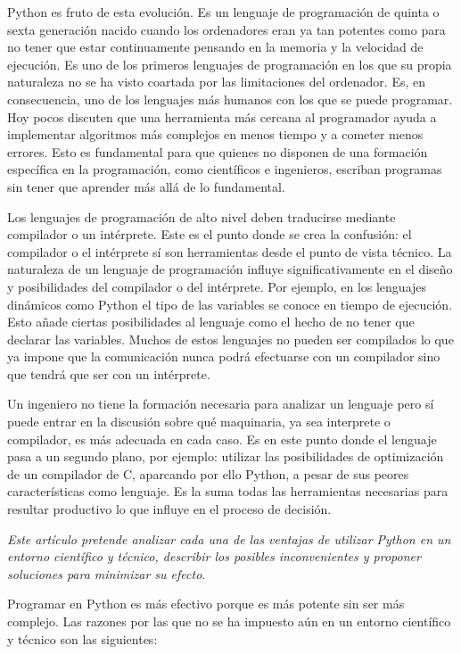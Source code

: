 \documentclass[a4paper,10pt]{article}
\begin{document}
Python es fruto de esta evolución.  Es un lenguaje de programación de
quinta o sexta generación nacido cuando los ordenadores eran ya tan
potentes como para no tener que estar continuamente pensando en la
memoria y la velocidad de ejecución.  Es uno de los primeros lenguajes
de programación en los que su propia naturaleza no se ha visto
coartada por las limitaciones del ordenador. Es, en consecuencia, uno
de los lenguajes más humanos con los que se puede programar. Hoy pocos
discuten que una herramienta más cercana al programador ayuda a
implementar algoritmos más complejos en menos tiempo y a cometer menos
errores. Esto es fundamental para que quienes no disponen de una
formación específica en la programación, como científicos e
ingenieros, escriban programas sin tener que aprender más allá de lo
fundamental.

Los lenguajes de programación de alto nivel deben traducirse mediante
compilador o un intérprete. Este es el punto donde se crea la
confusión: el compilador o el intérprete sí son herramientas desde el
punto de vista técnico. La naturaleza de un lenguaje de programación
influye significativamente en el diseño y posibilidades del compilador
o del intérprete.  Por ejemplo, en los lenguajes dinámicos como Python
el tipo de las variables se conoce en tiempo de ejecución.  Esto añade
ciertas posibilidades al lenguaje como el hecho de no tener que
declarar las variables.  Muchos de estos lenguajes no pueden ser
compilados lo que ya impone que la comunicación nunca podrá efectuarse
con un compilador sino que tendrá que ser con un intérprete.

Un ingeniero no tiene la formación necesaria para analizar un lenguaje
pero sí puede entrar en la discusión sobre qué maquinaria, ya sea
interprete o compilador, es más adecuada en cada caso.  Es en este
punto donde el lenguaje pasa a un segundo plano, por ejemplo: utilizar
las posibilidades de optimización de un compilador de C, aparcando por
ello Python, a pesar de sus peores características como lenguaje. Es
la suma todas las herramientas necesarias para resultar productivo lo
que influye en el proceso de decisión.

\emph{Este artículo pretende analizar cada una de las ventajas de utilizar
Python en un entorno científico y técnico, describir los posibles
inconvenientes y proponer soluciones para minimizar su efecto}.

Programar en Python es más efectivo porque es más potente sin ser más
complejo.  Las razones por las que no se ha impuesto aún en un entorno
científico y técnico son las siguientes:
\end{document}
